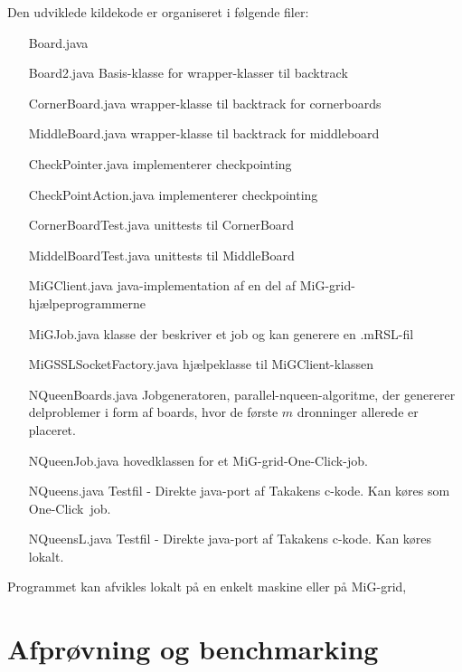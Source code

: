 \documentclass[draft,a4paper,10pt]{article}
\newcommand{\mig}{MiG}
\newcommand{\oc}{One-Click}
\begin{document}
Den udviklede kildekode er organiseret i følgende filer:
\begin{itemize}
	\item[Board.java] 
	\item[Board2.java] Basis-klasse for wrapper-klasser til backtrack
	\item[CornerBoard.java] wrapper-klasse til backtrack for cornerboards
	\item[MiddleBoard.java] wrapper-klasse til backtrack for middleboard
	\item[CheckPointer.java] implementerer checkpointing
	\item[CheckPointAction.java] implementerer checkpointing
	\item[CornerBoardTest.java] unittests til CornerBoard
	\item[MiddelBoardTest.java] unittests til MiddleBoard
	\item[MiGClient.java] java-implementation af en del af \mig-grid-hjælpeprogrammerne
	\item[MiGJob.java] klasse der beskriver et job og kan generere en .mRSL-fil
	\item[MiGSSLSocketFactory.java] hjælpeklasse til MiGClient-klassen
	\item[NQueenBoards.java] Jobgeneratoren, parallel-nqueen-algoritme, der genererer delproblemer i form af boards, hvor de første $m$ dronninger allerede er placeret. 
	\item[NQueenJob.java] hovedklassen for et \mig-grid-\oc-job. 
	\item[NQueens.java] Testfil - Direkte java-port af Takakens c-kode. Kan køres som \oc\ job.
	\item[NQueensL.java] Testfil - Direkte java-port af Takakens c-kode. Kan køres lokalt.
\end{itemize}

Programmet kan afvikles lokalt på en enkelt maskine eller på \mig-grid,  



\section{Afprøvning og benchmarking}
\end{document}
